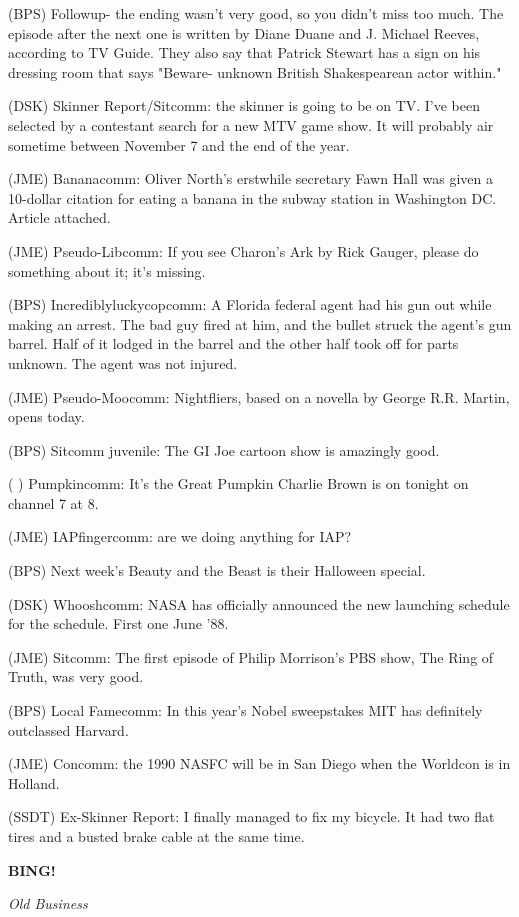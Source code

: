 \documentclass[12pt]{article}
\newcommand{\bing}{{\bf BING!} }
\newcommand{\goto}[1]{\bing \vskip 12pt \centerline{{\em{#1}}}}
\begin{document}
(BPS) Followup- the ending wasn't very good, so you didn't miss too much. The episode after the next one is written by Diane Duane and J. Michael Reeves, according to TV Guide. They also say that Patrick Stewart has a sign on his dressing room that says "Beware- unknown British Shakespearean actor within."

(DSK) Skinner Report/Sitcomm: the skinner is going to be on TV. I've been selected by a contestant search for a new MTV game show. It will probably air sometime between November 7 and the end of the year.

(JME) Bananacomm: Oliver North's erstwhile secretary Fawn Hall was given a 10-dollar citation for eating a banana in the subway station in Washington DC. Article attached.

(JME) Pseudo-Libcomm: If you see Charon's Ark by Rick Gauger, please do something about it; it's missing.

(BPS) Incrediblyluckycopcomm: A Florida federal agent had his gun out while making an arrest. The bad guy fired at him, and the bullet struck the agent's gun barrel. Half of it lodged in the barrel and the other half took off for parts unknown. The agent was not injured.

(JME) Pseudo-Moocomm: Nightfliers, based on a novella by George R.R. Martin, opens today.

(BPS) Sitcomm juvenile: The GI Joe cartoon show is amazingly good.

( ) Pumpkincomm: It's the Great Pumpkin Charlie Brown is on tonight on channel 7 at 8.

(JME) IAPfingercomm: are we doing anything for IAP?

(BPS) Next week's Beauty and the Beast is their Halloween special.

(DSK) Whooshcomm: NASA has officially announced the new launching schedule for the schedule. First one June '88.

(JME) Sitcomm: The first episode of Philip Morrison's PBS show, The Ring of Truth, was very good.

(BPS) Local Famecomm: In this year's Nobel sweepstakes MIT has definitely outclassed Harvard.

(JME) Concomm: the 1990 NASFC will be in San Diego when the Worldcon is in Holland.

(SSDT) Ex-Skinner Report: I finally managed to fix my bicycle. It had two flat tires and a busted brake cable at the same time.

\goto{Old Business}
\end{document}

